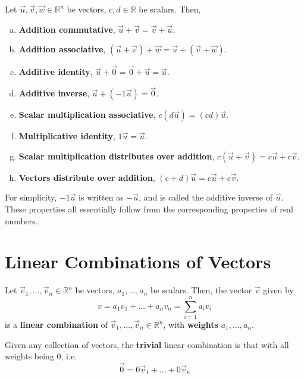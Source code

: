 \documentclass[letterpaper,12pt]{article}
\begin{document}
\begin{theorem}
Let $\vec{u}, \vec{v}, \vec{w} \in \mathbb{R}^n$ be vectors, $c, d \in \mathbb{R}$ be scalars. Then,
\begin{enumerate}[(a)]
    \item \textbf{Addition commutative}, $\vec{u} + \vec{v} = \vec{v} + \vec{u}$.
    \item \textbf{Addition associative}, $(\vec{u} + \vec{v}) + \vec{w} = \vec{u} + (\vec{v} + \vec{w})$.
    \item \textbf{Additive identity}, $\vec{u} + \vec{0} = \vec{0} + \vec{u} = \vec{u}$.
    \item \textbf{Additive inverse}, $\vec{u} + (-1\vec{u}) = \vec{0}$.
    \item \textbf{Scalar multiplication associative}, $c(d\vec{u}) = (cd) \vec{u}$.
    \item \textbf{Multiplicative identity}, $1 \vec{u} = \vec{u}$.
    \item \textbf{Scalar multiplication distributes over addition}, $c(\vec{u} + \vec{v}) = c\vec{u} + c\vec{v}$.
    \item \textbf{Vectors distribute over addition}, $(c + d) \vec{u} = c\vec{u} + c\vec{v}$.
\end{enumerate}
\end{theorem}

For simplicity, $-1\vec{u}$ is written as $-\vec{u}$, and is called the additive inverse of $\vec{u}$. These properties all essentially follow from the corresponding properties of real numbers.

\section*{Linear Combinations of Vectors}
\begin{definition}
Let $\vec{v}_1, \dots, \vec{v}_n \in \mathbb{R}^n$ be vectors, $a_1, \dots, a_n$ be scalars. Then, the vector $\vec{v}$ given by
\begin{equation*}
    v = a_1 v_1 + \dots + a_n v_n = \sum_{i=1}^n a_i v_i
\end{equation*}
is a \textbf{linear combination} of $\vec{v}_1, \dots, \vec{v}_n \in \mathbb{R}^n$, with \textbf{weights} $a_1, \dots, a_n$.
\end{definition}

\begin{example}
Given any collection of vectors, the \textbf{trivial} linear combination is that with all weights being 0, i.e.
\begin{equation*}
    \vec{0} = 0 \vec{v}_1 + \dots + 0 \vec{v}_n
\end{equation*}
\end{example}
\end{document}
